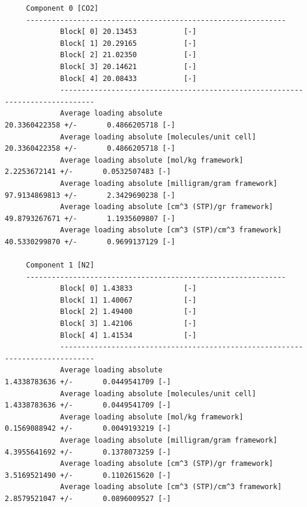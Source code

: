 \begin{tiny}
\begin{verbatim}
     Component 0 [CO2]
     -------------------------------------------------------------
             Block[ 0] 20.13453           [-]
             Block[ 1] 20.29165           [-]
             Block[ 2] 21.02350           [-]
             Block[ 3] 20.14621           [-]
             Block[ 4] 20.08433           [-]
             ------------------------------------------------------------------------------
             Average loading absolute                             20.3360422358 +/-       0.4866205718 [-]
             Average loading absolute [molecules/unit cell]       20.3360422358 +/-       0.4866205718 [-]
             Average loading absolute [mol/kg framework]                  2.2253672141 +/-       0.0532507483 [-]
             Average loading absolute [milligram/gram framework]         97.9134869813 +/-       2.3429690238 [-]
             Average loading absolute [cm^3 (STP)/gr framework]          49.8793267671 +/-       1.1935609807 [-]
             Average loading absolute [cm^3 (STP)/cm^3 framework]        40.5330299870 +/-       0.9699137129 [-]
     
     Component 1 [N2]
     -------------------------------------------------------------
             Block[ 0] 1.43833            [-]
             Block[ 1] 1.40067            [-]
             Block[ 2] 1.49400            [-]
             Block[ 3] 1.42106            [-]
             Block[ 4] 1.41534            [-]
             ------------------------------------------------------------------------------
             Average loading absolute                              1.4338783636 +/-       0.0449541709 [-]
             Average loading absolute [molecules/unit cell]        1.4338783636 +/-       0.0449541709 [-]
             Average loading absolute [mol/kg framework]                  0.1569088942 +/-       0.0049193219 [-]
             Average loading absolute [milligram/gram framework]          4.3955641692 +/-       0.1378073259 [-]
             Average loading absolute [cm^3 (STP)/gr framework]           3.5169521490 +/-       0.1102615620 [-]
             Average loading absolute [cm^3 (STP)/cm^3 framework]         2.8579521047 +/-       0.0896009527 [-]
\end{verbatim}
\end{tiny}

